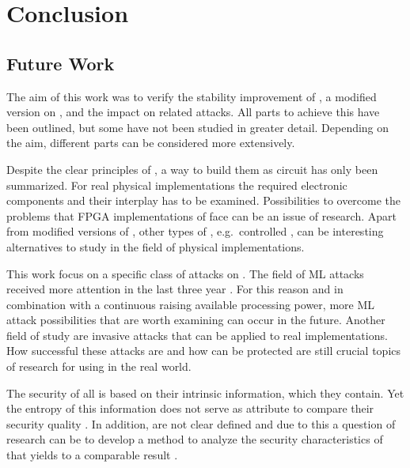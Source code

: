 \chapter{Conclusion}
\label{cap:conclusion}

\section{Future Work}

The aim of this work was to verify the stability improvement of \mpufs, a modified version on \apufs, and the impact on related attacks.
All parts to achieve this have been outlined, but some have not been studied in greater detail.
Depending on the aim, different parts can be considered more extensively.

Despite the clear principles of \apufs, a way to build them as circuit has only been summarized.
For real physical implementations the required electronic components and their interplay has to be examined.
Possibilities to overcome the problems that \ac{FPGA} implementations of \apufs face can be an issue of research.
Apart from modified versions of \apufs, other types of \pufs, e.g.\ controlled \pufs, can be interesting alternatives to study in the field of physical implementations.

This work focus on a specific class of attacks on \pufs.
The field of \ac{ML} attacks received more attention in the last three year \cite{Google2017MachineTrends}.
For this reason and in combination with a continuous raising available processing power, more \ac{ML} attack possibilities that are worth examining can occur in the future.
Another field of study are invasive attacks that can be applied to real \puf implementations.
How successful these attacks are and how \pufs can be protected are still crucial topics of research for using \pufs in the real world.

The security of all \pufs is based on their intrinsic information, which they contain.
Yet the entropy of this information does not serve as attribute to compare their security quality \cite{Ruhrmair2010ModelingFunctions}.
In addition, \pufs are not clear defined and due to this a question of research can be to develop a method to analyze the security characteristics of \pufs that yields to a comparable result \cite{Becker2015ThePUFs}.

